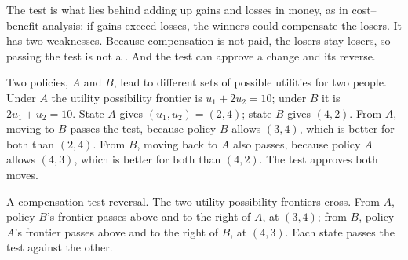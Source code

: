 The test is what lies behind adding up gains and losses in money, as in cost--benefit analysis: if gains
exceed losses, the winners could compensate the losers. It has two weaknesses. Because compensation is
not paid, the losers stay losers, so passing the test is not a . And the test can approve
a change and its reverse.

Two policies, $A$ and $B$, lead to different sets of possible utilities for two people. Under $A$ the
utility possibility frontier is $u_1 + 2u_2 = 10$; under $B$ it is $2u_1 + u_2 = 10$. State $A$ gives
$(u_1, u_2) = (2, 4)$; state $B$ gives $(4, 2)$. From $A$, moving to $B$ passes the test, because policy $B$ allows
$(3, 4)$, which is better for both than $(2, 4)$. From $B$, moving back to $A$ also passes, because policy $A$
allows $(4, 3)$, which is better for both than $(4, 2)$. The test approves both moves.

\begin{omfigure}

{\small A compensation-test reversal. The two utility possibility frontiers cross. From $A$, policy $B$'s
frontier passes above and to the right of $A$, at $(3, 4)$; from $B$, policy $A$'s frontier passes above
and to the right of $B$, at $(4, 3)$. Each state passes the test against the other.}
\end{omfigure}

